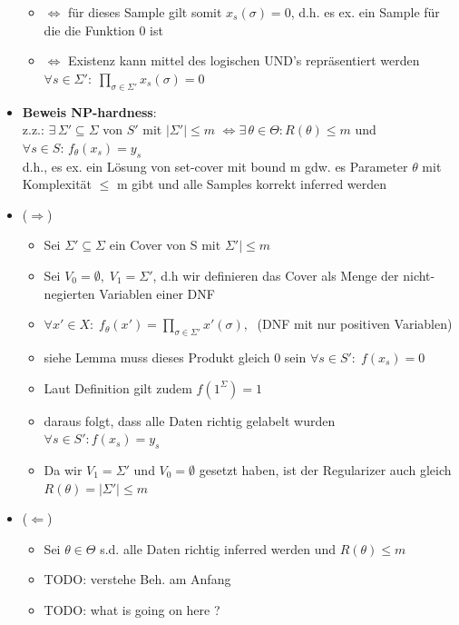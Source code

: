 \documentclass[12pt,a4paper]{article}
\begin{document}
\begin{itemize}
\begin{itemize}
\item $\Leftrightarrow$ für dieses Sample gilt somit $x_s(\sigma) = 0$, d.h. es ex. ein Sample für die die Funktion 0 ist
\item $\Leftrightarrow$ Existenz kann mittel des logischen UND's repräsentiert werden\\
$\displaystyle \forall s\in\Sigma':\; \prod_{\sigma\in\Sigma'}x_s(\sigma)=0$
\end{itemize}
\item \textbf{Beweis NP-hardness}:\\
z.z.: $\exists\, \Sigma' \subseteq \Sigma$ von $S'$ mit $|\Sigma'|\leq m$ $\Leftrightarrow \exists\, \theta\in\Theta: R(\theta) \leq m$ und\\
$\forall s \in S: \, f_\theta(x_s)=y_s$\\
d.h., es ex. ein Lösung von set-cover mit bound m gdw. es Parameter $\theta$ mit Komplexität $\leq$ m gibt und alle Samples korrekt inferred werden

\item ($\Rightarrow$)
\begin{itemize}
\item Sei $\Sigma' \subseteq \Sigma$ ein Cover von S mit $\Sigma'|\leq m$
\item Sei $V_0 = \emptyset, \; V_1=\Sigma'$, d.h wir definieren das Cover als Menge der nicht-negierten Variablen einer DNF
\item $\displaystyle \forall x' \in X:\; f_\theta(x')=\prod_{\sigma\in\Sigma'} x'(\sigma),\;$ (DNF mit nur positiven Variablen)
\item siehe Lemma muss dieses Produkt gleich 0 sein $\forall s \in S':\;f(x_s)=0$
\item Laut Definition gilt zudem $f(1^\Sigma)=1$
\item daraus folgt, dass alle Daten richtig gelabelt wurden\\ $\forall s\in S': f(x_s)=y_s$
\item Da wir $V_1 = \Sigma'$ und $V_0 = \emptyset$ gesetzt haben, ist der Regularizer auch gleich $R(\theta)= |\Sigma'| \leq m$
\end{itemize}
\item ($\Leftarrow$)
\begin{itemize}
\item Sei $\theta \in \Theta$ s.d. alle Daten richtig inferred werden und $R(\theta) \leq m$
\item TODO: verstehe Beh. am Anfang
\item TODO: what is going on here ?
\end{itemize}
\end{itemize}
\end{document}
